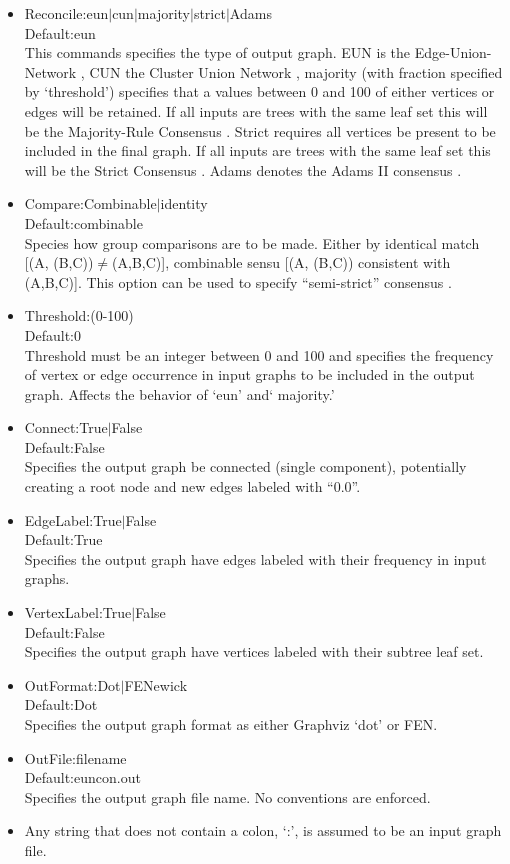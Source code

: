 \documentclass[11pt]{memoir}
\begin{document}
	
	\begin{itemize}
		\item {Reconcile:eun$\mid$cun$\mid$majority$\mid$strict$\mid$Adams\\Default:eun\\This commands specifies the type of output graph.
		EUN is the Edge-Union-Network \cite{MiyagiandWheeler2019}, CUN the Cluster Union Network \citep{Baroni2005},
		majority (with fraction specified by `threshold') specifies that a values between 0 and 100 of either vertices or edges will be retained.  If all inputs are trees with the same leaf set this will be the Majority-Rule Consensus \citep{MargushandMcMorris1981}.
		Strict requires all vertices be present to be included in the final graph.  If all inputs are trees with the same leaf set this will be the Strict Consensus \citep{Schuhandpolhemus1980}. Adams denotes the Adams II consensus \citep{Adams1972}.}
		\item{Compare:Combinable$\mid$identity\\Default:combinable\\Species how group comparisons are to be made.  Either by identical match [(A, (B,C))$\neq$(A,B,C)],
			combinable sensu \cite{Nelson1979} [(A, (B,C)) consistent with (A,B,C)].  This option can be used to specify ``semi-strict'' consensus
			\citep{Bremer1990}.
		}
		\item{Threshold:(0-100)\\Default:0\\Threshold must be an integer between 0 and 100 and specifies the frequency of vertex or edge occurrence in input graphs to be included in the output graph.  Affects the behavior of `eun' and` majority.'
		}
		\item{Connect:True$\mid$False\\Default:False\\Specifies the output graph be connected (single component), potentially creating a root node and new edges labeled with ``0.0''.
		}
		\item{EdgeLabel:True$\mid$False\\Default:True\\Specifies the output graph have edges labeled with their frequency in input graphs.
		}
		\item{VertexLabel:True$\mid$False\\Default:False\\Specifies the output graph have vertices labeled with their subtree leaf set.
		}
		\item{OutFormat:Dot$\mid$FENewick\\Default:Dot\\Specifies the output graph format as either Graphviz `dot' or FEN.
		}
		\item{OutFile:filename\\Default:euncon.out\\Specifies the output graph file name. No conventions are enforced.
		}
		\item{Any string that does not contain a colon, `:', is assumed to be an input graph file. 
		}
	\end{itemize}
	
\end{document}
